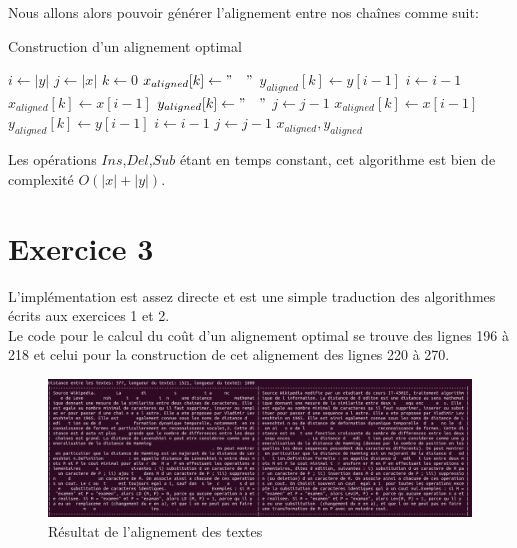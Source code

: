 \documentclass{article}
\begin{document}
Nous allons alors pouvoir générer l'alignement entre nos chaînes comme suit:
\begin{algorithm}
\caption{Construction d'un alignement optimal}\label{algo:alignement}
\begin{algorithmic}[1]
	\State $i \gets  \lvert y \rvert $	
	\State $j \gets  \lvert x \rvert $	
	\State $k \gets 0$
			\State $x_{aligned}[k] \gets "\quad"$
			\State $y_{aligned}[k] \gets y[i-1]$
			\State $i \gets i-1$
			\State $x_{aligned}[k] \gets x[i-1]$
			\State $y_{aligned}[k] \gets "\quad"$
			\State $j \gets j-1$
			\State $x_{aligned}[k] \gets x[i-1]$
			\State $y_{aligned}[k] \gets y[i-1]$
			\State $i \gets i-1$
			\State $j \gets j-1$
		\EndIf
	\EndWhile	
	\State\Return $x_{aligned}, y_{aligned}$
\EndProcedure
\end{algorithmic}
\end{algorithm}

Les opérations $Ins$,$Del$,$Sub$ étant en temps constant, cet algorithme est 
bien de complexité $O(\lvert x\rvert+\lvert y\rvert)$.

\section{Exercice 3}

L'implémentation est assez directe et est une simple traduction des
algorithmes écrits aux exercices 1 et 2.\\
Le code pour le calcul du coût d'un alignement optimal se trouve des lignes 196
à 218 et celui pour la construction de cet alignement des lignes 220 à 270.\\

\begin{figure}[!hbt]
	\centering
	\includegraphics[width=0.95\linewidth]{./images/exo3.png}
	\caption{Résultat de l'alignement des textes}%
	\label{fig:exo3}
\end{figure}
\end{document}
